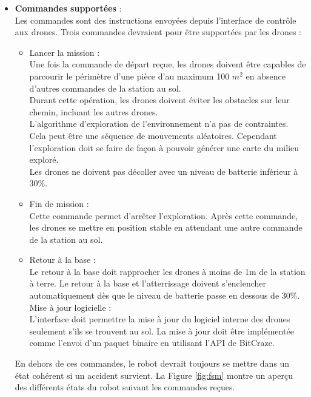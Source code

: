 \documentclass{mistcoursedoc}
\begin{document}
\begin{itemize}
  \item \textbf{Commandes supportées} :\\
        Les commandes sont des instructions envoyées depuis l'interface de contrôle
        aux drones. Trois commandes devraient pour être supportées par les drones :
        \begin{itemize}
          \item Lancer la mission : \\
                Une fois la commande de départ reçue, les drones doivent être capables de parcourir le périmètre
                d’une pièce d’au maximum 100 $m^2$ en absence d’autres commandes de la station au sol. \\
                Durant cette opération, les drones doivent éviter les obstacles sur leur chemin, incluant les autres drones.\\
                L’algorithme d’exploration de l’environnement n’a pas de contraintes.
                Cela peut être une séquence de mouvements aléatoires. Cependant l'exploration doit se faire
                de façon à pouvoir générer une carte du milieu exploré.\\
                Les drones ne doivent pas décoller avec un niveau de batterie inférieur à 30\%.
          \item Fin de mission : \\
                Cette commande permet d'arrêter l'exploration. Après cette commande, les drones se mettre en
                position stable en attendant une autre commande de la station au sol.
          \item Retour à la base : \\
                Le retour à la base doit rapprocher les drones à moins de 1m de la station à terre.
                Le retour à la base et l’atterrissage doivent s’enclencher automatiquement dès que le niveau
                de batterie passe en dessous de 30\%.
                Mise à jour logicielle : \\
                L’interface doit permettre la mise à jour du logiciel interne des drones seulement s’ils se trouvent au sol. La mise à jour doit être implémentée comme l’envoi d’un paquet binaire en utilisant l’API de BitCraze.
        \end{itemize}
        \par
        En dehors de ces commandes, le robot devrait toujours se mettre dans un état cohérent si un accident survient.
        La Figure \ref{fig:fsm} montre un aperçu des différents états du robot suivant les commandes reçues.

\end{itemize}
\end{document}

